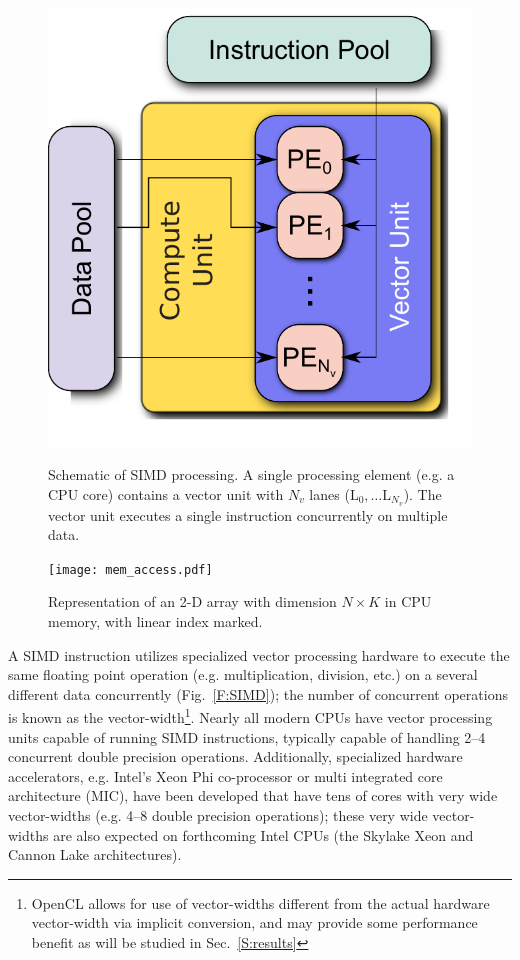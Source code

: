 \documentclass[12pt,number,sort&compress]{elsarticle}
\begin{document}
\begin{figure}[htb]
  \centering
  \begin{minipage}[t]{0.45\linewidth}
      \includegraphics[width=\textwidth]{SIMD.pdf}
      \caption{Schematic of SIMD processing.  A single processing element (e.g. a CPU core) contains a vector unit with $N_v$ lanes ($\text{L}_0,\ldots \text{L}_{N_v}$).  The vector unit executes a single instruction concurrently on multiple data.}
      \label{F:SIMD}
  \end{minipage}
  \hfill
  \begin{minipage}[t]{0.45\linewidth}
      \texttt{[image: mem\_access.pdf]}
      \caption{Representation of an 2-D array with dimension $N \times K$ in CPU memory, with linear index marked.}
      \label{F:mem}
  \end{minipage}
\end{figure}

A SIMD instruction utilizes specialized vector processing hardware to execute the same floating point operation (e.g. multiplication, division, etc.) on a several different data concurrently (Fig.~\ref{F:SIMD}); the number of concurrent operations is known as the vector-width\footnote{OpenCL allows for use of vector-widths different from the actual hardware vector-width via implicit conversion, and may provide some performance benefit as will be studied in Sec.~\ref{S:results}}.
Nearly all modern CPUs have vector processing units capable of running SIMD instructions, typically capable of handling 2--4 concurrent double precision operations.
Additionally, specialized hardware accelerators, e.g. Intel's Xeon Phi co-processor or multi integrated core architecture (MIC), have been developed that have tens of cores with very wide vector-widths (e.g. 4--8 double precision operations); these very wide vector-widths are also expected on forthcoming Intel CPUs (the Skylake Xeon and Cannon Lake architectures).
\end{document}
